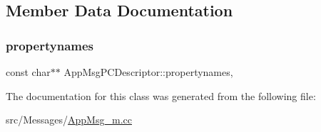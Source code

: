 \subsection{Member Data Documentation}
\mbox{\label{classAppMsgPCDescriptor_aaeca386eddf80dd71ff4cdd3bb1353a7}} 
\subsubsection{\texorpdfstring{propertynames}{propertynames}}
{\footnotesize\ttfamily const char$\ast$$\ast$ App\+Msg\+P\+C\+Descriptor\+::propertynames\hspace{0.3cm}{\ttfamily [mutable]}, {\ttfamily [private]}}



The documentation for this class was generated from the following file\+:\begin{DoxyCompactItemize}
\item 
src/\+Messages/\hyperlink{AppMsg__m_8cc}{App\+Msg\+\_\+m.\+cc}\end{DoxyCompactItemize}
